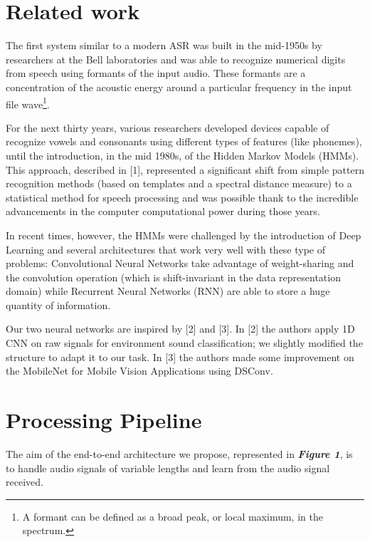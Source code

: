 \documentclass[conference]{IEEEtran}
\begin{document}

\section{Related work}
The first system similar to a modern ASR was built in the mid-1950s by researchers at the Bell laboratories and was able to recognize numerical digits from speech using formants of the input audio. These formants are a concentration of the acoustic energy around a particular frequency in the input file wave\footnote{A formant can be defined as a broad peak, or local maximum, in the spectrum.}. 

For the next thirty years, various researchers developed devices capable of recognize vowels and consonants using different types of features (like phonemes), until the introduction, in the mid 1980s, of the Hidden Markov Models (HMMs). This approach, described in [1], represented a significant shift from simple pattern recognition methods (based on templates and a spectral distance measure) to a statistical method for speech processing and was possible thank to the incredible advancements in the computer computational power during those years.

In recent times, however, the HMMs were challenged by the introduction of Deep Learning and several architectures that work very well with these type of problems: Convolutional Neural Networks take advantage of weight-sharing and the convolution operation (which is shift-invariant in the data representation domain) while Recurrent Neural Networks (RNN) are able to store a huge quantity of information.

Our two neural networks are inspired by [2] and [3]. In [2] the authors apply 1D CNN on raw signals for environment sound classification; we slightly modified the structure to adapt it to our task. In [3] the authors made some improvement on the MobileNet for Mobile Vision Applications using DSConv. 
\hfill
\section{Processing Pipeline}
The aim of the end-to-end architecture we propose, represented in \textbf{\textit{Figure 1}}, is to handle audio signals of variable lengths and learn from the audio signal received.
\end{document}
